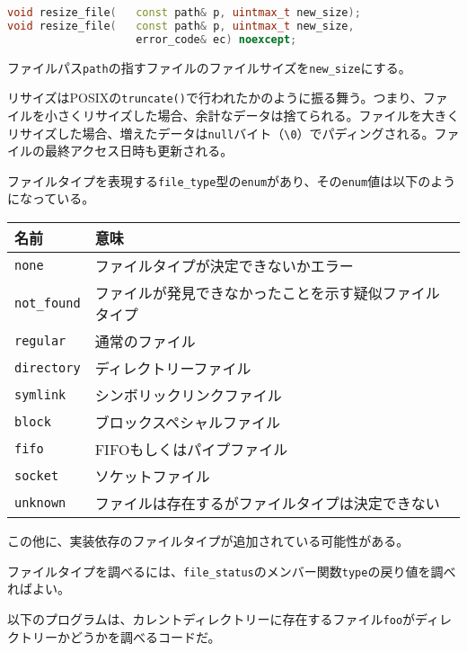 \bgroup
\begin{lstlisting}[language=C++]
void resize_file(   const path& p, uintmax_t new_size);
void resize_file(   const path& p, uintmax_t new_size,
                    error_code& ec) noexcept;
\end{lstlisting}
\egroup

ファイルパス\lstinline!path!の指すファイルのファイルサイズを\lstinline!new_size!にする。

リサイズはPOSIXの\lstinline!truncate()!で行われたかのように振る舞う。つまり、ファイルを小さくリサイズした場合、余計なデータは捨てられる。ファイルを大きくリサイズした場合、増えたデータは\lstinline!null!バイト（\lstinline!\0!）でパディングされる。ファイルの最終アクセス日時も更新される。

%

%

ファイルタイプを表現する\lstinline!file_type!型の\lstinline!enum!があり、その\lstinline!enum!値は以下のようになっている。

\small
\begin{longtable}[l]{@{\ \ }p{}p{}@{\ \ }}
\toprule
名前 & 意味\tabularnewline
\midrule
\endhead
\lstinline!none! & ファイルタイプが決定できないかエラー\tabularnewline
\lstinline!not_found! &
ファイルが発見できなかったことを示す疑似ファイルタイプ\tabularnewline
\lstinline!regular! & 通常のファイル\tabularnewline
\lstinline!directory! & ディレクトリーファイル\tabularnewline
\lstinline!symlink! & シンボリックリンクファイル\tabularnewline
\lstinline!block! & ブロックスペシャルファイル\tabularnewline
\lstinline!fifo! & FIFOもしくはパイプファイル\tabularnewline
\lstinline!socket! & ソケットファイル\tabularnewline
\lstinline!unknown! &
ファイルは存在するがファイルタイプは決定できない\tabularnewline
\bottomrule
\end{longtable}
\normalsize

この他に、実装依存のファイルタイプが追加されている可能性がある。

ファイルタイプを調べるには、\lstinline!file_status!のメンバー関数\lstinline!type!の戻り値を調べればよい。

以下のプログラムは、カレントディレクトリーに存在するファイル\lstinline!foo!がディレクトリーかどうかを調べるコードだ。

